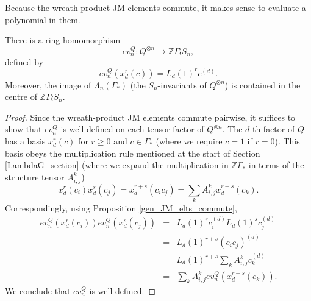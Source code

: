 Because the wreath-product JM elements commute, it makes sense to evaluate a polynomial in them.
\begin{proposition}
There is a ring homomorphism
\[
ev_n^Q: Q^{\otimes n} \to \mathbb{Z} \Gamma \wr S_n,
\]
defined by 
\[
ev_n^Q(x_d^r(c)) = L_d(1)^r c^{(d)}.
\]
Moreover, the image of $\Lambda_n(\Gamma_*)$ \textup{(}the $S_n$-invariants of $Q^{\otimes n}$\textup{)} is contained in the centre of $\mathbb{Z} \Gamma \wr S_n$.
\end{proposition}
\begin{proof}
Since the wreath-product JM elements commute pairwise, it suffices to show that $ev_n^Q$ is well-defined on each tensor factor of $Q^{\otimes n}$. The $d$-th factor of $Q$ has a basis $x_d^r(c)$ for $r \geq 0$ and $c \in \Gamma_*$ (where we require $c=1$ if $r=0$). This basis obeys the multiplication rule mentioned at the start of Section \ref{LambdaG_section} (where we expand the multiplication in $\mathbb{Z}\Gamma_*$ in terms of the structure tensor $A_{i,j}^k$)
\[
x_d^r(c_i) x_d^s(c_j) = x_d^{r+s}(c_ic_j) = \sum_k A_{i,j}^k x_d^{r+s}(c_k).
\]
Correspondingly, using Proposition \ref{gen_JM_elts_commute},
\begin{eqnarray*}
ev_n^Q(x_d^r(c_i))ev_n^Q(x_d^s(c_j)) &=& L_d(1)^r c_i^{(d)} L_d(1)^s c_j^{(d)} \\
&=& L_d(1)^{r+s} (c_ic_j)^{(d)} \\
&=& L_d(1)^{r+s} \sum_k A_{i,j}^k c_k^{(d)} \\
&=& \sum_k A_{i,j}^k ev_n^Q(x_d^{r+s}(c_k)).
\end{eqnarray*}
We conclude that $ev_n^Q$ is well defined. 


\end{proof}
